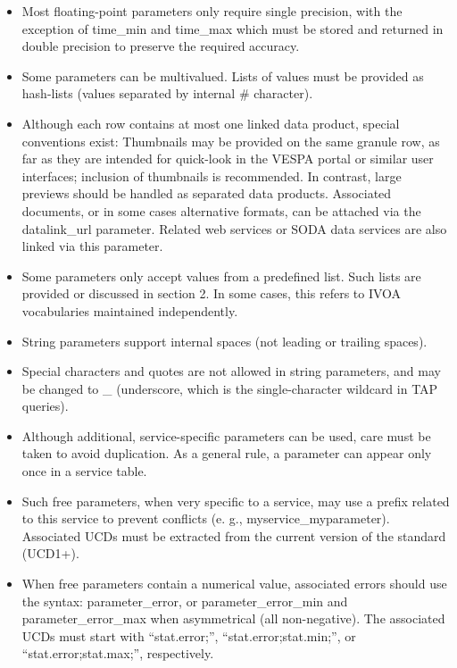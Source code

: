 \documentclass[11pt,a4paper]{ivoa}
\begin{document}
\begin{itemize}
\begin{itemize}
\item Most floating-point parameters only require single precision, with the exception of time\_min and time\_max which must be stored and returned in double precision to preserve the required accuracy. 

\item Some parameters can be multivalued. Lists of values must be provided as hash-lists (values separated by internal \# character).

\item Although each row contains at most one linked data product, special conventions exist: 
Thumbnails may be provided on the same granule row, as far as they are intended for quick-look in the VESPA portal or similar user interfaces; inclusion of thumbnails is recommended. In contrast, large previews should be handled as separated data products.
Associated documents, or in some cases alternative formats, can be attached via the datalink\_url parameter. Related web services or SODA data services are also linked via this parameter.

\item Some parameters only accept values from a predefined list. Such lists are provided or discussed in section 2. In some cases, this refers to IVOA vocabularies maintained independently.

\item String parameters support internal spaces (not leading or trailing spaces).

\item Special characters and quotes are not allowed in string parameters, and may be changed to \_ (underscore, which is the single-character wildcard in TAP queries). 

\item Although additional, service-specific parameters can be used, care must be taken to avoid duplication. As a general rule, a parameter can appear only once in a service table.

\item Such free parameters, when very specific to a service, may use a prefix related to this service to prevent conflicts (e. g., myservice\_myparameter). Associated UCDs must be extracted from the current version of the standard (UCD1+).

\item When free parameters contain a numerical value, associated errors should use the syntax: parameter\_error, or parameter\_error\_min and parameter\_error\_max when asymmetrical (all non-negative). The associated UCDs must start with ``stat.error;'', ``stat.error;stat.min;'', or ``stat.error;stat.max;'', respectively.
\end{itemize}


\end{itemize}
\end{document}
